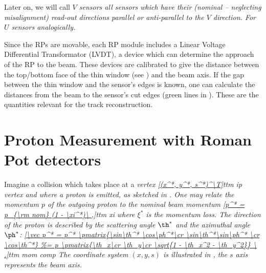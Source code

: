 Later on, we will call \em{$V$ sensors} all sensors which have their (nominal -- neglecting misalignment) read-out directions parallel or anti-parallel to the $V$ direction. For $U$ sensors analogically.



Since the RPs are movable, each RP module includes a Linear Voltage Differential Transformator (LVDT), a device which can determine the approach of the RP to the beam. These devices are calibrated to give the distance between the top/bottom face of the thin window (see ) and the beam axis. If the gap between the thin window and the sensor's edges is known, one can calculate the distances from the beam to the sensor's cut edges (green lines in ). These are the quantities relevant for the track reconstruction.




\section[rp measurement]{Proton Measurement with Roman Pot detectors}



Imagine a collision which takes place at a \em{vertex}
\eqref{(x^*, y^*, s^*)^\T}{ttm ip vertex}
and where a proton is emitted, as sketched in . One may relate the momentum $p$ of the outgoing proton to the nominal beam momentum
\eqref{p^* = p_{\rm nom} (1 - \xi^*)\ ,}{ttm xi}
where $\xi^*$ is the \em{momentum loss}. The direction of the proton is described by the \em{scattering angle} $\th^*$ and the \em{azimuthal angle} $\ph^*$:
\eqref{\vec p^* = p^* \pmatrix{\sin\th^* \cos\ph^*\cr \sin\th^*\sin\ph^* \cr \cos\th^*}
\ .}{ttm mom comp}
The coordinate system $(x, y, s)$ is illustrated in , the $s$ axis represents the beam axis.

